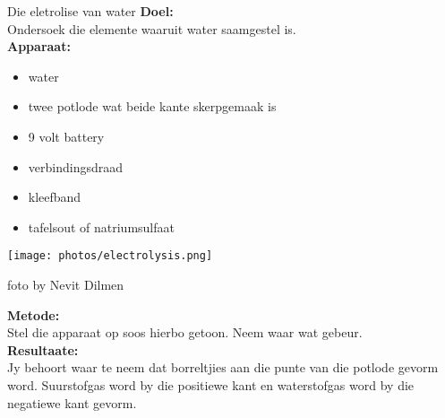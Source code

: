 \begin{g_experiment}{Die eletrolise van water}
\textbf{Doel:} \\
Ondersoek die elemente waaruit water saamgestel is.\\
\textbf{Apparaat:}\\
\begin{minipage}{.4\textwidth}
\begin{itemize}[noitemsep]
 \item water
\item twee potlode wat beide kante skerpgemaak is
\item 9 volt battery
\item verbindingsdraad
\item kleefband
\item tafelsout of natriumsulfaat
\end{itemize}
\end{minipage}
\begin{minipage}{.6\textwidth} 
\begin{center}
   \texttt{[image: photos/electrolysis.png]}\\
\begin{caption}foto by Nevit Dilmen\end{caption}
\end{center}
\end{minipage} \nopagebreak
\textbf{Metode:}\\
Stel die apparaat op soos hierbo getoon. Neem waar wat gebeur.\\
\textbf{Resultaate:}\\
Jy behoort waar te neem dat borreltjies aan die punte van die potlode gevorm word. Suurstofgas word by die positiewe kant en waterstofgas word by die negatiewe kant gevorm.
\end{g_experiment}

            \nopagebreak


